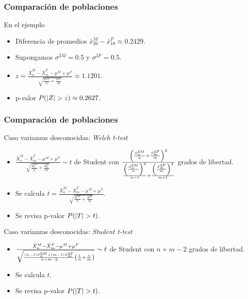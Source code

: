 \documentclass[table]{beamer}
\begin{document}
\begin{frame}
    \frametitle{Comparación de poblaciones}
    \begin{block}{En el ejemplo}
        \begin{itemize}
            \item Diferencia de promedios $\bar{x}^{M}_{26} - \bar{x}^{F}_{18} \approx 0.2429$.
            \item Supongamos $\sigma^{2 M} = 0.5$ y $\sigma^{2 F} = 0.5$.
            \item $z = \frac{\bar{X}^{M}_{n} - \bar{X}^{F}_{m} - \mu^{M} + \mu^{F}}{\sqrt{\frac{\sigma^{2 M}}{n} + \frac{\sigma^{2 F}}{m}}} \approx 1.1201$.
            \item p-valor $\prob{\vparens{Z} > z} \approx 0.2627$.
        \end{itemize}
    \end{block}
\end{frame}

\begin{frame}
    \frametitle{Comparación de poblaciones}
    \begin{block}{Caso varianzas desconocidas: \emph{Welch t-test}}
        \begin{itemize}
            \item $\frac{\bar{X}^{M}_{n} - \bar{X}^{F}_{m} - \mu^{M} + \mu^{F}}{\sqrt{\frac{S^{2 M}_{n}}{n} + \frac{S^{2 F}_{m}}{m}}} \sim t$ de Student con $\frac{\parens{\frac{S^{2 M}_{n}}{n} + \frac{S^{2 F}_{m}}{m}}^{2}}{\frac{\parens{\frac{S^{2 M}_{n}}{n}}^{2}}{n - 1} + \frac{\parens{\frac{S^{2 F}_{m}}{m}}^{2}}{m + 1}}$ grados de libertad.
            \item Se calcula $t = \frac{\bar{X}^{M}_{n} - \bar{X}^{F}_{m} - \mu^{M} + \mu^{F}}{\sqrt{\frac{S^{2 M}}{n} + \frac{S^{2 F}}{m}}}$.
            \item Se revisa p-valor $\prob{\vparens{T} > t}$.
        \end{itemize}
    \end{block}
    \begin{block}{Caso varianzas desconocidas: \emph{Student t-test}}
        \begin{itemize}
            \item $\frac{\bar{X}^{M}_{n} - \bar{X}^{F}_{m} - \mu^{M} + \mu^{F}}{\sqrt{\frac{\parens{n - 1} S^{2 M}_{n} + \parens{m - 1} S^{2 F}_{m}}{n + m - 2} \parens{\frac{1}{n} + \frac{1}{m}}}} \sim t$ de Student con $n + m - 2$ grados de libertad.
            \item Se calcula $t$.
            \item Se revisa p-valor $\prob{\vparens{T} > t}$.
        \end{itemize}
    \end{block}
\end{frame}
\end{document}

